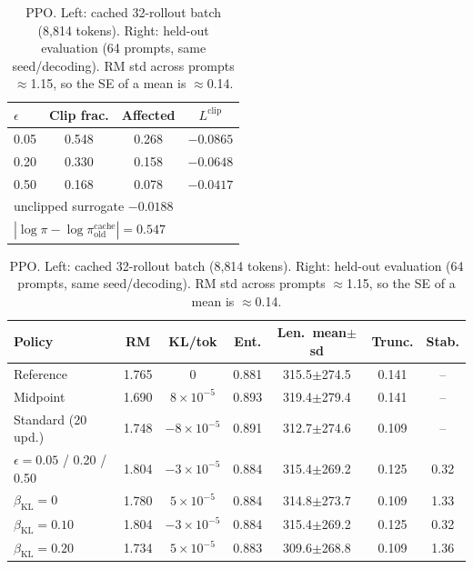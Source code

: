 \documentclass{article}
\begin{document}
\begin{table}[t]
\centering\footnotesize
\caption{PPO. Left: cached 32-rollout batch (8{,}814 tokens). Right: held-out evaluation (64 prompts, same seed/decoding). RM std across prompts $\approx$1.15, so the SE of a mean is $\approx$0.14.}
\label{tab:ppo}
\begin{tabular}{lccc}
\toprule
$\epsilon$ & Clip frac. & Affected & $L^{\text{clip}}$ \\
\midrule
0.05 & 0.548 & 0.268 & $-0.0865$ \\
0.20 & 0.330 & 0.158 & $-0.0648$ \\
0.50 & 0.168 & 0.078 & $-0.0417$ \\
\midrule
\multicolumn{4}{l}{unclipped surrogate $-0.0188$}\\
\multicolumn{4}{l}{$|\log\pi-\log\pi^{\text{cache}}_{\text{old}}|=0.547$}\\
\bottomrule
\end{tabular}\hfill
\begin{tabular}{lcccccc}
\toprule
Policy & RM & KL/tok & Ent. & Len.\ mean$\pm$sd & Trunc. & Stab. \\
\midrule
Reference & 1.765 & 0 & 0.881 & 315.5$\pm$274.5 & 0.141 & -- \\
Midpoint & 1.690 & $8{\times}10^{-5}$ & 0.893 & 319.4$\pm$279.4 & 0.141 & -- \\
Standard (20 upd.) & 1.748 & $-8{\times}10^{-5}$ & 0.891 & 312.7$\pm$274.6 & 0.109 & -- \\
\midrule
$\epsilon{=}0.05$ / 0.20 / 0.50 & 1.804 & $-3{\times}10^{-5}$ & 0.884 & 315.4$\pm$269.2 & 0.125 & 0.32 \\
\midrule
$\beta_{\text{KL}}{=}0$ & 1.780 & $5{\times}10^{-5}$ & 0.884 & 314.8$\pm$273.7 & 0.109 & 1.33 \\
$\beta_{\text{KL}}{=}0.10$ & 1.804 & $-3{\times}10^{-5}$ & 0.884 & 315.4$\pm$269.2 & 0.125 & 0.32 \\
$\beta_{\text{KL}}{=}0.20$ & 1.734 & $5{\times}10^{-5}$ & 0.883 & 309.6$\pm$268.8 & 0.109 & 1.36 \\
\bottomrule
\end{tabular}
\end{table}
\end{document}
